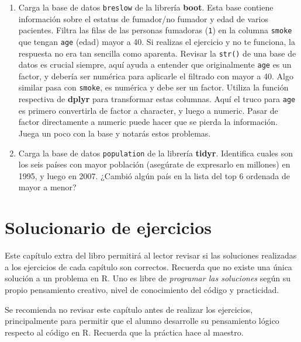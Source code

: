 \documentclass[
]{article}
\theoremstyle{definition}
\theoremstyle{definition}
\theoremstyle{definition}
\theoremstyle{definition}
\theoremstyle{remark}
\begin{document}
\begin{enumerate}
\def\labelenumi{\arabic{enumi}.}
\item
  Carga la base de datos \texttt{breslow} de la librería \textbf{boot}. Esta base contiene información sobre el estatus de fumador/no fumador y edad de varios pacientes. Filtra las filas de las personas fumadoras (\texttt{1}) en la columna \texttt{smoke} que tengan \texttt{age} (edad) mayor a 40. Si realizas el ejercicio y no te funciona, la respuesta no era tan sencilla como aparenta. Revisar la \texttt{str()} de una base de datos es crucial siempre, aquí ayuda a entender que originalmente \texttt{age} es un factor, y debería ser numérica para aplicarle el filtrado con mayor a 40. Algo similar pasa con \texttt{smoke}, es numérica y debe ser un factor. Utiliza la función respectiva de \textbf{dplyr} para transformar estas columnas. Aquí el truco para \texttt{age} es primero convertirla de factor a character, y luego a numeric. Pasar de factor directamente a numeric puede hacer que se pierda la información. Juega un poco con la base y notarás estos problemas.
\item
  Carga la base de datos \texttt{population} de la librería \textbf{tidyr}. Identifica cuales son los seis países con mayor población (asegúrate de expresarlo en millones) en 1995, y luego en 2007. ¿Cambió algún país en la lista del top 6 ordenada de mayor a menor?
\end{enumerate}

\hypertarget{appendix-apuxe9ndices}{%
\appendix}


\hypertarget{solucionario-de-ejercicios}{%
\section{\texorpdfstring{\textbf{Solucionario de ejercicios}}{Solucionario de ejercicios}}\label{solucionario-de-ejercicios}}

Este capítulo extra del libro permitirá al lector revisar si las soluciones realizadas a los ejercicios de cada capítulo son correctos. Recuerda que no existe una única solución a un problema en R. Uno es libre de \emph{programar las soluciones} según su propio pensamiento creativo, nivel de conocimiento del código y practicidad.

Se recomienda no revisar este capítulo antes de realizar los ejercicios, principalmente para permitir que el alumno desarrolle su pensamiento lógico respecto al código en R. Recuerda que la práctica hace al maestro.
\end{document}
